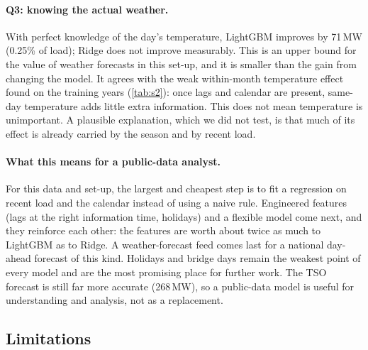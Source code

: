 \paragraph{Q3: knowing the actual weather.} With perfect knowledge of the day's temperature,
LightGBM improves by 71\,MW (0.25\% of load); Ridge does not improve measurably. This is an upper
bound for the value of weather forecasts in this set-up, and it is smaller than the gain from
changing the model. It agrees with the weak within-month temperature effect found on the training
years (\cref{tab:s2}): once lags and calendar are present, same-day temperature adds little extra
information. This does not mean temperature is unimportant. A plausible explanation, which we did not
test, is that much of its effect is already carried by the season and by recent load.

\paragraph{What this means for a public-data analyst.} For this data and set-up, the largest and
cheapest step is to fit a regression on recent load and the calendar instead of using a naive rule.
Engineered features (lags at the right information time, holidays) and a flexible model come next,
and they reinforce each other: the features are worth about twice as much to LightGBM as to Ridge.
A weather-forecast feed comes last for a national day-ahead forecast of this kind. Holidays and bridge days remain the weakest
point of every model and are the most promising place for further work. The TSO forecast is still
far more accurate (268\,MW), so a public-data model is useful for understanding and analysis, not as
a replacement.

\subsection{Limitations}
\label{sec:limitations}

